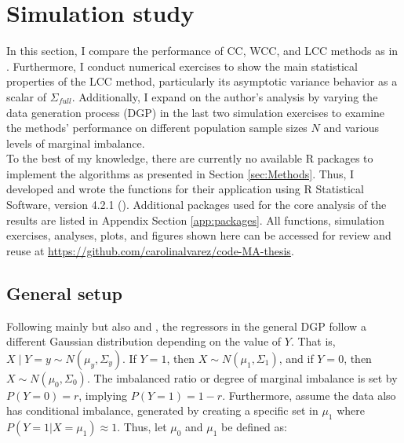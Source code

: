 \section{Simulation study}
\label{sec:sim_study}



In this section, I compare the performance of CC, WCC, and LCC methods as in \textcite{hastie2014}. Furthermore, I conduct numerical exercises to show the main statistical properties of the LCC method, particularly its asymptotic variance behavior as a scalar of $\Sigma_{full}$. Additionally, I expand on the author's analysis by varying the data generation process (DGP) in the last two simulation exercises to examine the methods' performance on different population sample sizes $N$ and various levels of marginal imbalance.\\

To the best of my knowledge, there are currently no available R packages to implement the algorithms as presented in Section \ref{sec:Methods}. Thus, I developed and wrote the functions for their application using R Statistical Software, version 4.2.1 (\cite{R}). Additional packages used for the core analysis of the results are listed in Appendix Section \ref{app:packages}. All functions, simulation exercises, analyses, plots, and figures shown here can be accessed for review and reuse at \href{https://github.com/carolinalvarez/code-MA-thesis}{https://github.com/carolinalvarez/code-MA-thesis}.

\subsection{General setup}
\label{sec:sim_general}

Following mainly \textcite{hastie2014} but also \textcite{wang2020rare} and \textcite{han2020local}, the regressors in the general DGP follow a different Gaussian distribution depending on the value of $Y$. That is, $X \mid Y=y \sim N\left(\mu_y, \Sigma_y\right)$. If $Y=1$, then $X \sim N\left(\mu_1, \Sigma_1\right)$, and if $Y=0$, then $X \sim N\left(\mu_0, \Sigma_0\right)$. The imbalanced ratio or degree of marginal imbalance is set by $P(Y=0) = r$, implying $P(Y=1) = 1-r$. Furthermore, assume the data also has conditional imbalance, generated by creating a specific set in $\mu_1$ where $P(Y=1 | X = \mu_1) \approx 1$. Thus, let $\mu_0$ and $\mu_1$ be defined as:


